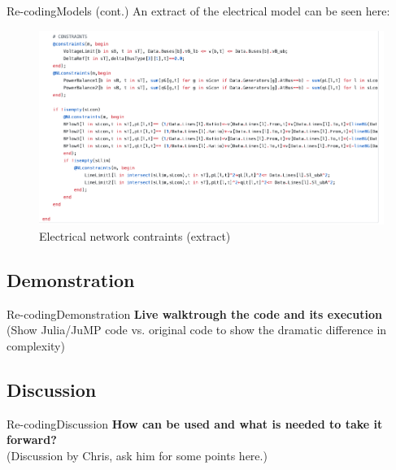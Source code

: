 \documentclass[handout]{beamer}
\begin{document}
\begin{frame}[t]{Re-coding}{Models (cont.)}
  An extract of the electrical model can be seen here:

  \begin{figure}
  \begin{center}
  \includegraphics[height=0.66\textheight]{OPF2.png}
  \end{center}
  \caption{Electrical network contraints (extract)}\label{fig:opf}
  \end{figure}

\end{frame}


\subsection{Demonstration}

  \begin{frame}{Re-coding}{Demonstration}
    \textbf{Live walktrough the code and its execution}\\[12pt]
    (Show Julia/JuMP code vs. original code to show the dramatic difference in complexity)
  \end{frame}

\subsection{Discussion}
\begin{frame}{Re-coding}{Discussion}
  \textbf{How can be used and what is needed to take it forward?}\\[12pt]
  (Discussion by Chris, ask him for some points here.)

\end{frame}
\end{document}
